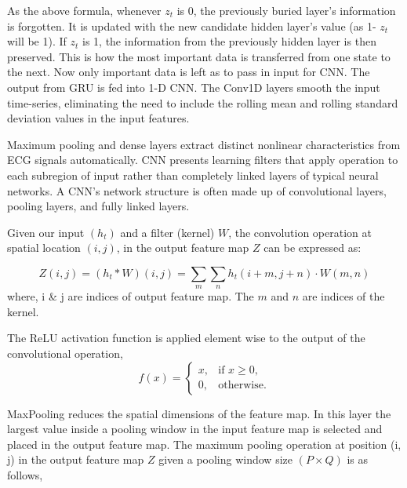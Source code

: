 \documentclass[a4paper, fleqn]{cas-sc}
\begin{document}
As the above formula,  whenever $z_t$ is 0,  the previously buried layer's information is forgotten. It is updated with the new candidate hidden layer's value (as 1- $z_t$ will be 1). If $z_t$ is 1,  the information from the previously hidden layer is then preserved. This is how the most important data is transferred from one state to the next. Now only important data is left as to pass in input for CNN. The output from GRU is fed into 1-D CNN. The Conv1D layers smooth the input time-series,  eliminating the need to include the rolling mean and rolling standard deviation values in the input features.





Maximum pooling and dense layers extract distinct nonlinear characteristics from ECG signals automatically. CNN presents learning filters that apply operation to each subregion of input rather than completely linked layers of typical neural networks. A CNN's network structure is often made up of convolutional layers,  pooling layers,  and fully linked layers.






Given our input $(h_t)$ and a filter (kernel) \(W\),  the convolution operation at spatial location $(i, j)$,  in the output feature map  \(Z\) can be expressed as:

   \begin{equation}
   Z(i,  j) = ( h_t \ast W)(i,  j) = \sum_{m}\sum_{n} h_t(i+m,  j+n) \cdot W(m,  n)
   \end{equation}
where,  i \& j are indices of output feature map. The $m$ and $n$ are indices of the kernel.


The ReLU activation function is applied element wise to the output of the convolutional operation, \\ 

\begin{equation}
    f(x)=  \begin {cases}  x,  & \text{if } x \geq 0,  \\
    0,  & \text{otherwise}. \end{cases}
\end{equation}
  

MaxPooling reduces the spatial dimensions of the feature map. In this layer the largest value inside a pooling window in the input feature map is selected and placed in the output feature map. The maximum pooling operation at position (i, j) in the output feature map \(Z\) given a pooling window size $(P \times Q)$ is as follows, 
\end{document}
